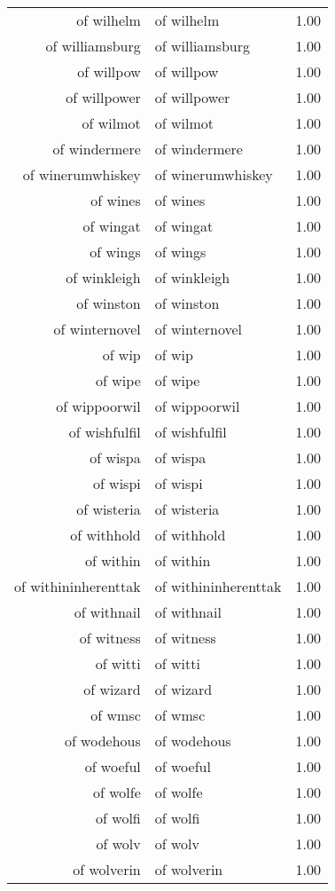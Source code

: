 \begin{table}[ht]
\begin{tabular}{rlr}
  of wilhelm & of wilhelm & 1.00 \\ 
  of williamsburg & of williamsburg & 1.00 \\ 
  of willpow & of willpow & 1.00 \\ 
  of willpower & of willpower & 1.00 \\ 
  of wilmot & of wilmot & 1.00 \\ 
  of windermere & of windermere & 1.00 \\ 
  of winerumwhiskey & of winerumwhiskey & 1.00 \\ 
  of wines & of wines & 1.00 \\ 
  of wingat & of wingat & 1.00 \\ 
  of wings & of wings & 1.00 \\ 
  of winkleigh & of winkleigh & 1.00 \\ 
  of winston & of winston & 1.00 \\ 
  of winternovel & of winternovel & 1.00 \\ 
  of wip & of wip & 1.00 \\ 
  of wipe & of wipe & 1.00 \\ 
  of wippoorwil & of wippoorwil & 1.00 \\ 
  of wishfulfil & of wishfulfil & 1.00 \\ 
  of wispa & of wispa & 1.00 \\ 
  of wispi & of wispi & 1.00 \\ 
  of wisteria & of wisteria & 1.00 \\ 
  of withhold & of withhold & 1.00 \\ 
  of within & of within & 1.00 \\ 
  of withininherenttak & of withininherenttak & 1.00 \\ 
  of withnail & of withnail & 1.00 \\ 
  of witness & of witness & 1.00 \\ 
  of witti & of witti & 1.00 \\ 
  of wizard & of wizard & 1.00 \\ 
  of wmsc & of wmsc & 1.00 \\ 
  of wodehous & of wodehous & 1.00 \\ 
  of woeful & of woeful & 1.00 \\ 
  of wolfe & of wolfe & 1.00 \\ 
  of wolfi & of wolfi & 1.00 \\ 
  of wolv & of wolv & 1.00 \\ 
  of wolverin & of wolverin & 1.00 \\ 

\end{tabular}
\end{table}
